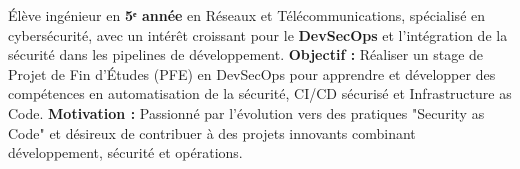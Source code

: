 
\begin{cvparagraph}

    Élève ingénieur en \textbf{5ᵉ année} en Réseaux et Télécommunications, spécialisé en cybersécurité, avec un intérêt croissant pour le \textbf{DevSecOps} et l'intégration de la sécurité dans les pipelines de développement.
    \newline
    \textbf{Objectif :} Réaliser un stage de Projet de Fin d'Études (PFE) en DevSecOps pour apprendre et développer des compétences en automatisation de la sécurité, CI/CD sécurisé et Infrastructure as Code.
    \newline
    \textbf{Motivation :} Passionné par l'évolution vers des pratiques "Security as Code" et désireux de contribuer à des projets innovants combinant développement, sécurité et opérations.

\end{cvparagraph}